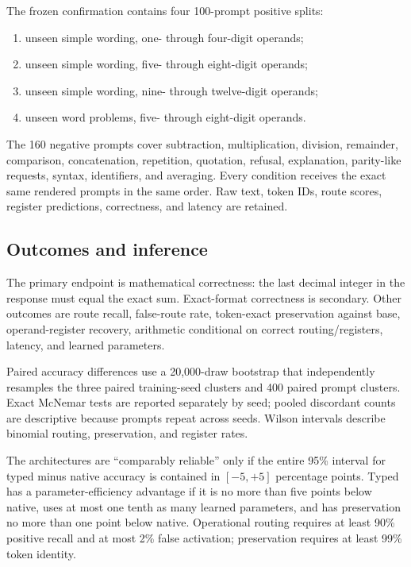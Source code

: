 \documentclass[11pt]{article}
\begin{document}
The frozen confirmation contains four 100-prompt positive splits:

\begin{enumerate}
  \item unseen simple wording, one- through four-digit operands;
  \item unseen simple wording, five- through eight-digit operands;
  \item unseen simple wording, nine- through twelve-digit operands;
  \item unseen word problems, five- through eight-digit operands.
\end{enumerate}

The 160 negative prompts cover subtraction, multiplication, division,
remainder, comparison, concatenation, repetition, quotation, refusal,
explanation, parity-like requests, syntax, identifiers, and averaging. Every
condition receives the exact same rendered prompts in the same order. Raw
text, token IDs, route scores, register predictions, correctness, and latency
are retained.

\subsection{Outcomes and inference}

The primary endpoint is mathematical correctness: the last decimal integer in
the response must equal the exact sum. Exact-format correctness is secondary.
Other outcomes are route recall, false-route rate, token-exact preservation
against base, operand-register recovery, arithmetic conditional on correct
routing/registers, latency, and learned parameters.

Paired accuracy differences use a 20,000-draw bootstrap that independently
resamples the three paired training-seed clusters and 400 paired prompt
clusters. Exact McNemar tests are reported separately by seed; pooled
discordant counts are descriptive because prompts repeat across seeds. Wilson
intervals describe binomial routing, preservation, and register rates.

The architectures are ``comparably reliable'' only if the entire 95\%
interval for typed minus native accuracy is contained in $[-5,+5]$ percentage
points. Typed has a parameter-efficiency advantage if it is no more than five
points below native, uses at most one tenth as many learned parameters, and
has preservation no more than one point below native. Operational routing
requires at least 90\% positive recall and at most 2\% false activation;
preservation requires at least 99\% token identity.
\end{document}
